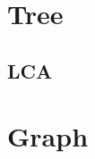 \documentclass[a4paper,10pt,twocolumn,oneside]{article}
\begin{document}
% 

% 

%

% 

% 

\section{Tree}

\subsection{LCA}


\section{Graph}

% 

% 
\end{document}
